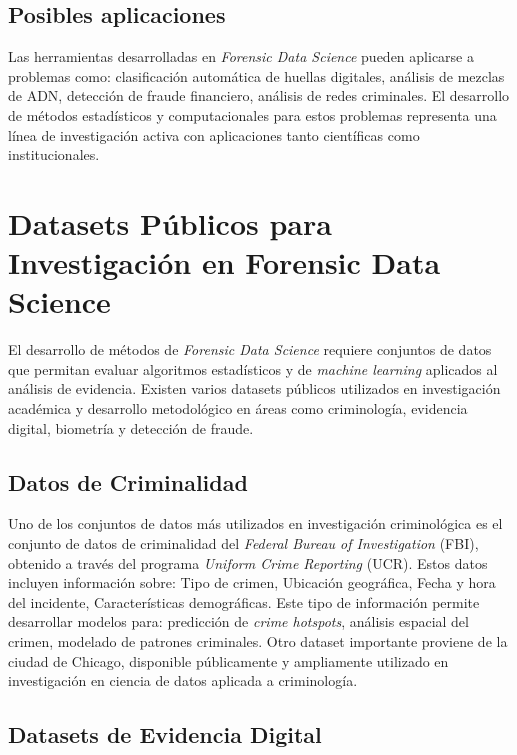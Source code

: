 \documentclass[a4paper,10pt,oneside]{article}
\begin{document}
\subsection{Posibles aplicaciones}

Las herramientas desarrolladas en \textit{Forensic Data Science} pueden aplicarse a problemas como: clasificaci\'on autom\'atica de huellas digitales, an\'alisis de mezclas de ADN, detecci\'on de fraude financiero, an\'alisis de redes criminales. El desarrollo de m\'etodos estad\'isticos y computacionales para estos problemas representa una l\'inea de investigaci\'on activa con aplicaciones tanto cient\'ificas como institucionales.

\section{Datasets P\'ublicos para Investigaci\'on en Forensic Data Science}

El desarrollo de m\'etodos de \textit{Forensic Data Science} requiere conjuntos de datos que permitan evaluar algoritmos estad\'isticos y de \textit{machine learning} aplicados al an\'alisis de evidencia. Existen varios datasets p\'ublicos utilizados en investigaci\'on acad\'emica y desarrollo metodol\'ogico en \'areas como criminolog\'ia, evidencia digital, biometr\'ia y detecci\'on de fraude.

\subsection{Datos de Criminalidad}

Uno de los conjuntos de datos m\'as utilizados en investigaci\'on criminol\'ogica es el conjunto de datos de criminalidad del \textit{Federal Bureau of Investigation} (FBI), obtenido a trav\'es del programa \textit{Uniform Crime Reporting} (UCR). Estos datos incluyen informaci\'on sobre:  Tipo de crimen, Ubicaci\'on geogr\'afica, Fecha y hora del incidente, Caracter\'isticas demogr\'aficas. Este tipo de informaci\'on permite desarrollar modelos para:  predicci\'on de \textit{crime hotspots}, an\'alisis espacial del crimen, modelado de patrones criminales. Otro dataset importante proviene de la ciudad de Chicago, disponible p\'ublicamente y ampliamente utilizado en investigaci\'on en ciencia de datos aplicada a criminolog\'ia.

\subsection{Datasets de Evidencia Digital}
\end{document}
